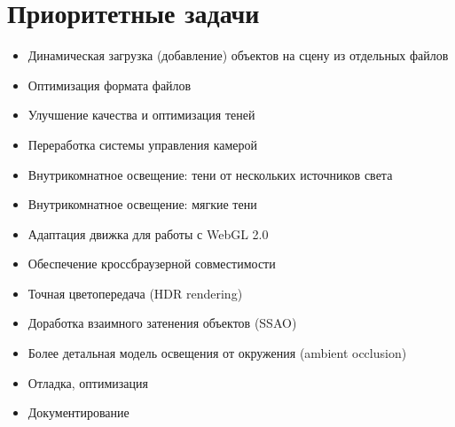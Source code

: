 \documentclass[a4paper,12pt,oneside]{sphinxmanual}
\begin{document}
\section{Приоритетные задачи}
\label{roadmap:id2}\begin{itemize}
\item {} 
Динамическая загрузка (добавление) объектов на сцену из отдельных файлов

\item {} 
Оптимизация формата файлов

\item {} 
Улучшение качества и оптимизация теней

\item {} 
Переработка системы управления камерой

\item {} 
Внутрикомнатное освещение: тени от нескольких источников света

\item {} 
Внутрикомнатное освещение: мягкие тени

\item {} 
Адаптация движка для работы с WebGL 2.0

\item {} 
Обеспечение кроссбраузерной совместимости

\item {} 
Точная цветопередача (HDR rendering)

\item {} 
Доработка взаимного затенения объектов (SSAO)

\item {} 
Более детальная модель освещения от окружения (ambient occlusion)

\item {} 
Отладка, оптимизация

\item {} 
Документирование

\end{itemize}
\end{document}
